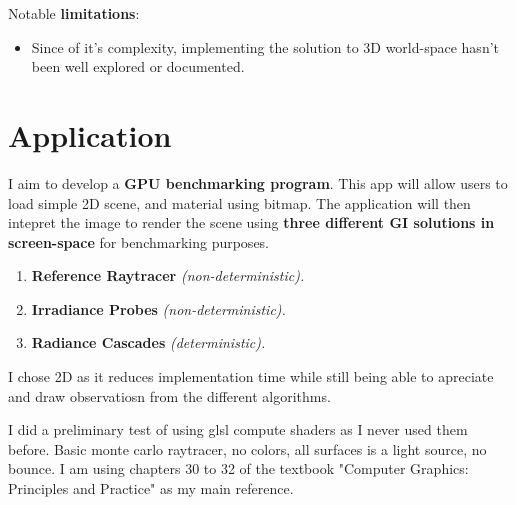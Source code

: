 \documentclass[sigconf, nonacm]{acmart}
\begin{document}
Notable \textbf{limitations}:
\begin{itemize}
    \item Since of it's complexity, implementing the solution to 3D world-space hasn't been well explored or documented. 
\end{itemize}


\section{Application}
I aim to develop a \textbf{GPU benchmarking program}. This app will allow users to load simple 2D scene, and material using bitmap. The application will then intepret the image to render the scene using \textbf{three different GI solutions in screen-space} for benchmarking purposes.
\begin{enumerate}
  \item \textbf{Reference Raytracer} \itshape{(non-deterministic)}.
  \item \textbf{Irradiance Probes} \itshape{(non-deterministic)}.
  \item \textbf{Radiance Cascades} \itshape{(deterministic)}.
\end{enumerate}
I chose 2D as it reduces implementation time while still being able to apreciate and draw observatiosn from the different algorithms.

\pagebreak

I did a preliminary test of using glsl compute shaders as I never used them before. Basic monte carlo raytracer, no colors, all surfaces is a light source, no bounce. I am using chapters 30 to 32 of the textbook "Computer Graphics: Principles and Practice"\cite{textbook} as my main reference.
\end{document}
